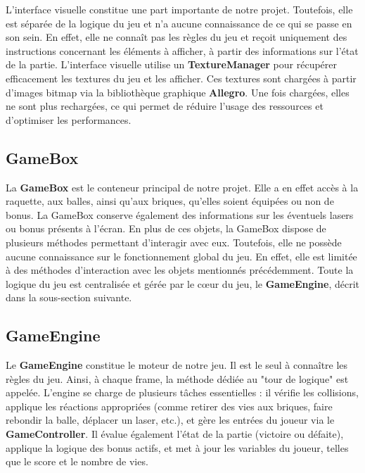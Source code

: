 \documentclass{article}
\begin{document}
\noindent L'interface visuelle constitue une part importante de notre projet. Toutefois, elle est séparée de la logique du jeu et n'a aucune connaissance de ce qui se passe en son sein. En effet, elle ne connaît pas les règles du jeu et reçoit uniquement des instructions concernant les éléments à afficher, à partir des informations sur l'état de la partie. L'interface visuelle utilise un \textbf{TextureManager} pour récupérer efficacement les textures du jeu et les afficher. Ces textures sont chargées à partir d'images bitmap via la bibliothèque graphique \textbf{Allegro}. Une fois chargées, elles ne sont plus rechargées, ce qui permet de réduire l'usage des ressources et d'optimiser les performances.

\subsection{GameBox}
\label{subsec:gamebox}

\noindent La \textbf{GameBox} est le conteneur principal de notre projet. Elle a en effet accès à la raquette, aux balles, ainsi qu'aux briques, qu'elles soient équipées ou non de bonus. La GameBox conserve également des informations sur les éventuels lasers ou bonus présents à l'écran. En plus de ces objets, la GameBox dispose de plusieurs méthodes permettant d'interagir avec eux. Toutefois, elle ne possède aucune connaissance sur le fonctionnement global du jeu. En effet, elle est limitée à des méthodes d'interaction avec les objets mentionnés précédemment. Toute la logique du jeu est centralisée et gérée par le cœur du jeu, le \textbf{GameEngine}, décrit dans la sous-section suivante.

\subsection{GameEngine}

\noindent Le \textbf{GameEngine} constitue le moteur de notre jeu. Il est le seul à connaître les règles du jeu. Ainsi, à chaque frame, la méthode dédiée au "tour de logique" est appelée. L'engine se charge de plusieurs tâches essentielles : il vérifie les collisions, applique les réactions appropriées (comme retirer des vies aux briques, faire rebondir la balle, déplacer un laser, etc.), et gère les entrées du joueur via le \textbf{GameController}. Il évalue également l'état de la partie (victoire ou défaite), applique la logique des bonus actifs, et met à jour les variables du joueur, telles que le score et le nombre de vies. \\
\end{document}
